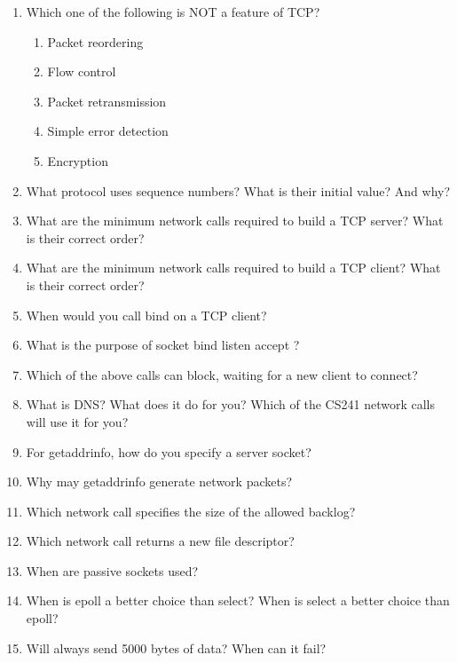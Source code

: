 \begin{enumerate}
\item Which one of the following is NOT a feature of TCP?
  \begin{enumerate}
  \item Packet reordering
  \item Flow control
  \item Packet retransmission
  \item Simple error detection
  \item Encryption
  \end{enumerate}

\item What protocol uses sequence numbers? What is their initial value? And why?

\item What are the minimum network calls required to build a TCP server? What is their correct order?

\item What are the minimum network calls required to build a TCP client? What is their correct order?

\item When would you call bind on a TCP client?

\item What is the purpose of socket bind listen accept ?

\item Which of the above calls can block, waiting for a new client to connect?

\item What is DNS? What does it do for you? Which of the CS241 network calls will use it for you?

\item For getaddrinfo, how do you specify a server socket?

\item Why may getaddrinfo generate network packets?

\item Which network call specifies the size of the allowed backlog?

\item Which network call returns a new file descriptor?

\item When are passive sockets used?

\item When is epoll a better choice than select? When is select a better choice than epoll?

\item Will  always send 5000 bytes of data? When can it fail?


\end{enumerate}
